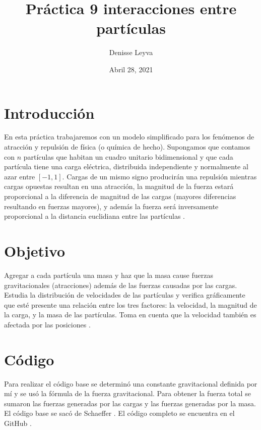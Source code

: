 \documentclass{article}
\title{Práctica 9 interacciones entre partículas}
\author{Denisse Leyva}
\date{Abril 28, 2021}
\begin{document}
\maketitle


\section{Introducción}
En esta práctica trabajaremos con un modelo simplificado para los fenómenos de atracción y repulsión de física (o química de hecho). Supongamos que contamos con $n$ partículas que habitan un cuadro unitario bidimensional y que cada partícula tiene una carga eléctrica, distribuida independiente y normalmente al azar entre $[-1, 1]$. Cargas de un mismo signo producirán una repulsión mientras cargas opuestas resultan en una atracción, la magnitud de la fuerza estará proporcional a la diferencia de magnitud de las cargas (mayores diferencias resultando en fuerzas mayores), y además la fuerza será inversamente proporcional a la distancia euclidiana entre las partículas \cite{Satu_Elisa_Schaeffer}.

\section{Objetivo}
Agregar a cada partícula una masa y haz que la masa cause fuerzas gravitacionales (atracciones) además de las fuerzas causadas por las cargas. Estudia la distribución de velocidades de las partículas y verifica gráficamente que esté presente una relación entre los tres factores: la velocidad, la magnitud de la carga, y la masa de las partículas. Toma en cuenta que la velocidad también es afectada por las posiciones \cite{Satu_Elisa_Schaeffer}. 

\section{Código}

Para realizar el código base se determinó una constante gravitacional definida por mí y se usó la fórmula de la fuerza gravitacional. Para obtener la fuerza total se sumaron las fuerzas generadas por las cargas y las fuerzas generadas por la masa. El código base se sacó de Schaeffer \cite{Elisa_Schaeffer}. El código completo se encuentra en el GitHub \cite{Denisse_Leyva}.
\end{document}
